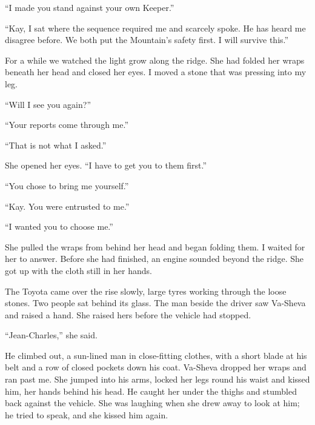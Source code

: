 ``I made you stand against your own Keeper.''\par

``Kay, I sat where the sequence required me and scarcely spoke. He has heard me disagree before. We both put the Mountain's safety first. I will survive this.''\par

For a while we watched the light grow along the ridge. She had folded her wraps beneath her head and closed her eyes. I moved a stone that was pressing into my leg.\par

``Will I see you again?''\par

``Your reports come through me.''\par

``That is not what I asked.''\par

She opened her eyes. ``I have to get you to them first.''\par

``You chose to bring me yourself.''\par

``Kay. You were entrusted to me.''\par

``I wanted you to choose me.''\par

She pulled the wraps from behind her head and began folding them. I waited for her to answer. Before she had finished, an engine sounded beyond the ridge. She got up with the cloth still in her hands.\par

The Toyota came over the rise slowly, large tyres working through the loose stones. Two people sat behind its glass. The man beside the driver saw Va-Sheva and raised a hand. She raised hers before the vehicle had stopped.\par

``Jean-Charles,'' she said.\par

He climbed out, a sun-lined man in close-fitting clothes, with a short blade at his belt and a row of closed pockets down his coat. Va-Sheva dropped her wraps and ran past me. She jumped into his arms, locked her legs round his waist and kissed him, her hands behind his head. He caught her under the thighs and stumbled back against the vehicle. She was laughing when she drew away to look at him; he tried to speak, and she kissed him again.\par

